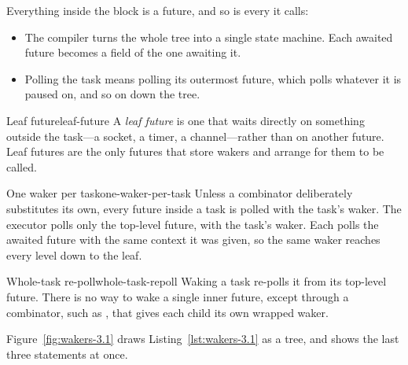 Everything inside the  block is a future, and so is every  it calls:

\begin{itemize}
    \item The compiler turns the whole tree into a single state machine. Each awaited future becomes a field of the one awaiting it.
    \item Polling the task means polling its outermost future, which polls whatever it is paused on, and so on down the tree.
\end{itemize}

\begin{definition}{Leaf future}{leaf-future}
    A \emph{leaf future} is one that waits directly on something outside the task---a socket, a timer, a channel---rather than on another future. Leaf futures are the only futures that store wakers and arrange for them to be called.
\end{definition}

\begin{lemma}{One waker per task}{one-waker-per-task}
    Unless a combinator deliberately substitutes its own, every future inside a task is polled with the task's waker.
    \why The executor polls only the top-level future, with the task's waker. Each  polls the awaited future with the same context it was given, so the same waker reaches every level down to the leaf.
\end{lemma}

\begin{corollary}{Whole-task re-poll}{whole-task-repoll}
    Waking a task re-polls it from its top-level future. There is no way to wake a single inner future, except through a combinator, such as , that gives each child its own wrapped waker.
\end{corollary}

Figure~\ref{fig:wakers-3.1} draws Listing~\ref{lst:wakers-3.1} as a tree, and shows the last three statements at once.

